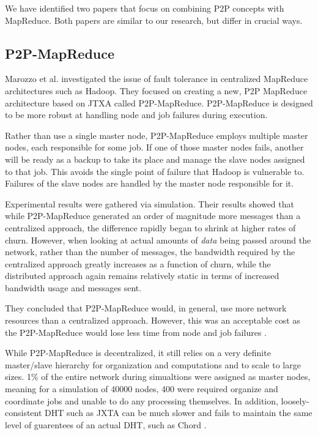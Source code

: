 \documentclass[10pt, conference, compsocconf]{IEEEtran}
\begin{document}
We have identified two papers that focus on combining P2P concepts with MapReduce.  Both papers are similar to our research, but differ in crucial ways.

\subsection{P2P-MapReduce}
Marozzo et al. \cite{marozzo2012p2p} investigated the issue of fault tolerance in centralized MapReduce architectures such as Hadoop.  They focused on creating a new, P2P MapReduce architecture based on JTXA \cite{935182} called P2P-MapReduce.  P2P-MapReduce is designed to be more robust at handling node and job failures during execution.

Rather than use a single master node, P2P-MapReduce employs multiple master nodes, each responsible for some job.  If one of those master nodes fails, another will be ready as a backup to take its place and manage the slave nodes assigned to that job.  This avoids the single point of failure that Hadoop is vulnerable to. Failures of the slave nodes are handled by the master node responsible for it.

Experimental results were gathered via simulation. Their results showed that while P2P-MapReduce generated an order of magnitude more messages than a centralized approach, the difference rapidly began to shrink at higher rates of churn.  However, when looking at actual amounts of \emph{data} being passed around the network, rather than the number of messages, the bandwidth required by the centralized approach greatly increases as a function of churn, while the distributed approach again remains relatively static in terms of increased bandwidth usage and messages sent.  

They concluded that P2P-MapReduce would, in general, use more network resources than a centralized approach. However, this was an acceptable cost as the P2P-MapReduce would lose less time from node and job failures \cite{marozzo2012p2p}.

While P2P-MapReduce is decentralized, it still relies on a very definite master/slave hierarchy for organization and computations and to scale to large sizes.  1\% of the entire network during simualtions were assigned as master nodes, meaning for a simulation of 40000 nodes, 400 were required organize and coordinate jobs and unable to do any processing themselves.  In addition, loosely-consistent DHT such as JXTA can be much slower and fails to maintain the same level of guarentees of an actual DHT, such as Chord \cite{5359174}.   %
\end{document}
